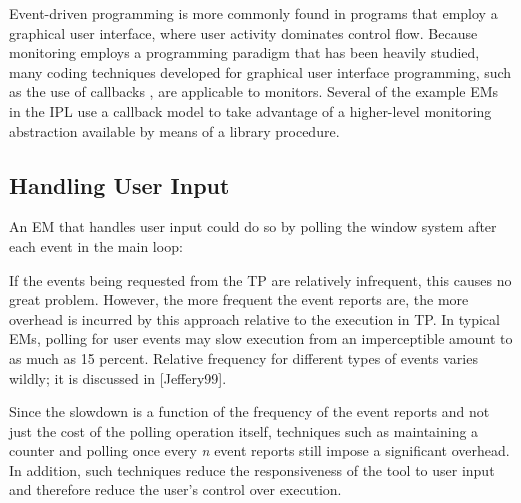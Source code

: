 

Event-driven programming is more commonly found in programs that
employ a graphical user interface, where user activity dominates
control flow. Because monitoring employs a programming paradigm that
has been heavily studied, many coding techniques developed for
graphical user interface programming, such as the use of callbacks
\cite{Clark85}, are applicable to monitors. Several of the example EMs
in the IPL use a callback model to take advantage of a
higher-level monitoring abstraction available by means of a library
procedure.

\subsection*{Handling User Input}

An EM that handles user input could do so by polling the window system
after each event in the main loop: 


\noindent If the events being requested from the TP are relatively
infrequent, this causes no great problem.  However, the more frequent
the event reports are, the more overhead is incurred by this approach
relative to the execution in TP.  In typical EMs, polling for user
events may slow execution from an imperceptible amount to as much as 15
percent.   Relative frequency for different types of events varies
wildly; it is discussed in [Jeffery99].

Since the slowdown is a function of the frequency of the event reports and
not just the cost of the polling operation itself, techniques such as
maintaining a counter and polling once every {\em n\/} event reports still
impose a significant overhead.  In addition, such techniques reduce the
responsiveness of the tool to user input and therefore reduce the user's
control over execution.

